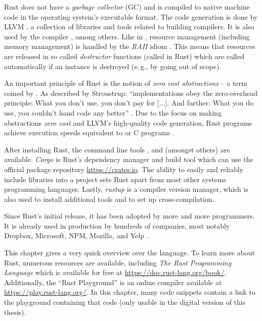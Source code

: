 Rust does not have a \emph{garbage collector} (GC) and is compiled to native machine code in the operating system's executable format.
The code generation is done by LLVM \cite{llvmwebsite, lattner2004llvm}, a collection of libraries and tools related to building compilers.
It is also used by the \cpp compiler , among others.
Like in \cpp, resource management (including memory management) is handled by the \emph{RAII} idiom \cite{raiihackcraft, stroustrup2001exception}.
This means that resources are released in so called \emph{destructor} functions (called  in Rust) which are called automatically if an instance is destroyed (e.\,g., by going out of scope).

An important principle of Rust is the notion of \emph{zero cost abstractions} -- a term coined by \cpp.
As described by Stroustrup: \enquote{\cpp implementations obey the zero-overhead principle: What you don’t use, you don’t pay for [...]. And further: What you do use, you couldn’t hand code any better} \cite{stroustrup2012foundations}.
Due to the focus on making abstractions \emph{zero cost} and LLVM's high-quality code generation, Rust programs achieve execution speeds equivalent to \cpp or C programs \cite{benchmarkgame}.

After installing Rust, the command line tools ,  and  (amongst others) are available.
\emph{Cargo} is Rust's dependency manager and build tool which can use the official package repository \url{https://crates.io}.
The ability to easily and reliably include libraries into a project sets Rust apart from most other systems programming languages.
Lastly, \emph{rustup} is a compiler version manager, which is also used to install additional tools and to set up cross-compilation.

Since Rust's initial release, it has been adopted by more and more programmers.
It is already used in production by hundreds of companies, most notably Dropbox, Microsoft, NPM, Mozilla, and Yelp \cite{rust-production}.

This chapter gives a very quick overview over the language.
To learn more about Rust, numerous resources are available, including \emph{The Rust Programming Language} \cite{klabnik2018rust} which is available for free at \url{https://doc.rust-lang.org/book/}.
Additionally, the \enquote{Rust Playground} is an online compiler available at \url{https://play.rust-lang.org/}.
In this chapter, many code snippets contain a link to the playground containing that code (only usable in the digital version of this thesis).

